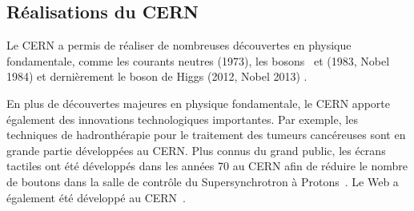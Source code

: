 \subsection{Réalisations du CERN}
Le CERN a permis de réaliser de nombreuses découvertes en physique fondamentale, comme
les courants neutres (1973),
les bosons \Wboson\ et \Zboson (1983, Nobel 1984) \cite{Wboson_discovery1,Wboson_discovery2,Wboson_discovery3,Zboson_discovery1,Zboson_discovery2}
et dernièrement le boson de Higgs (2012, Nobel 2013) \cite{ATLAS_Higgs_discovery,CMS_Higgs_discovery}.
\par En plus de découvertes majeures en physique fondamentale, le CERN apporte également des innovations technologiques importantes.
Par exemple, les techniques de hadronthérapie pour le traitement des tumeurs cancéreuses sont en grande partie développées au CERN.
Plus connus du grand public, les écrans tactiles ont été développés dans les années 70 au CERN afin de réduire le nombre de boutons dans la salle de contrôle du Supersynchrotron à Protons~\cite{CERN_touchscreen}.
Le Web a également été développé au CERN~\cite{CERN_web}.
